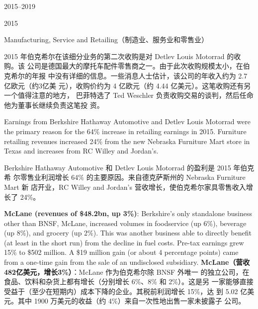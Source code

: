 \begin{chapter}{2015--2019}
\begin{section}{2015}
\begin{subsection}{Manufacturing, Service and Retailing（制造业、服务业和零售业）}
\begin{verseparallel}
{  }
  {
    2015 年伯克希尔在该细分业务的第二次收购是对 Detlev Louis Motorrad 的收购。该
    公司是德国最大的摩托车配件零售商之一。由于此次收购规模太小，在伯克希尔的年报
    中没有详细的信息。一些消息人士估计，该公司的年收入约为 2.7 亿欧元（约3亿美
    元），收购价约为 4 亿欧元（约 4.44 亿美元）。这笔收购还有另一个值得注意的地方，
    巴菲特选了 Ted Weschler 负责收购交易的谈判，然后任命他为董事长继续负责这笔投
    资。
  }
\end{verseparallel}

\begin{verseparallel}
  {
    Earnings from Berkshire Hathaway Automotive and Detlev Louis Motorrad were
    the primary reason for the 64\% increase in retailing earnings in 2015.
    Furniture retailing revenues increased 24\% from the new Nebraska Furniture
    Mart store in Texas and increases from RC Willey and Jordan’s. \\
  }
  {

    Berkshire Hathaway Automotive 和 Detlev Louis Motorrad 的盈利是 2015 年伯克希
    尔零售业利润增长 64\% 的主要原因。来自德克萨斯州的 Nebraska Furniture Mart 新
    店开业，RC Willey and Jordan’s 营收增长，使伯克希尔家具零售收入增长了 24\%。

  }
\end{verseparallel}

\begin{verseparallel}
  {
    \textbf{McLane (revenues of \$48.2bn, up 3\%)}: Berkshire’s only standalone
    business other than BNSF, McLane, increased volumes in foodservice (up
    6\%), beverage (up 8\%), and grocery (up 2\%). This was another business
    able to directly benefit (at least in the short run) from the decline in fuel
    costs. Pre-tax earnings grew 15\% to \$502 million. A \$19 million gain (or
    about 4 percentage points) came from a one-time gain from the sale of an
    undisclosed subsidiary.
  }
  {
    \textbf{McLane（营收 482亿美元，增长3\%）}：McLane 作为伯克希尔除 BNSF 外唯一
    的独立公司，在食品、饮料和杂货上都有增长（分别增长 6\%、8\% 和 2\%）。这是另
    一家能够直接受益于（至少在短期内）成本下降的企业。其税前利润增长 15\%，达
    到 5.02 亿美元。其中 1900 万美元的收益（约 4\%）来自一次性地出售一家未披露子
    公司。
  }
\end{verseparallel}
\end{subsection}


\end{section}
\end{chapter}
